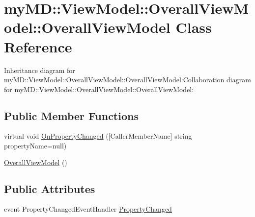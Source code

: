 \hypertarget{classmy_m_d_1_1_view_model_1_1_overall_view_model_1_1_overall_view_model}{
\section{my\-MD::View\-Model::Overall\-View\-Model::Overall\-View\-Model Class Reference}
\label{dd/d0e/classmy_m_d_1_1_view_model_1_1_overall_view_model_1_1_overall_view_model}
}
Inheritance diagram for my\-MD::View\-Model::Overall\-View\-Model::Overall\-View\-Model:Collaboration diagram for my\-MD::View\-Model::Overall\-View\-Model::Overall\-View\-Model:\subsection*{Public Member Functions}
\begin{CompactItemize}
\item 
\hypertarget{classmy_m_d_1_1_view_model_1_1_overall_view_model_1_1_overall_view_model_36ccceda2aba353ee6523df3e370c625}{
virtual void \hyperlink{classmy_m_d_1_1_view_model_1_1_overall_view_model_1_1_overall_view_model_36ccceda2aba353ee6523df3e370c625}{On\-Property\-Changed} (\mbox{[}Caller\-Member\-Name\mbox{]} string property\-Name=null)}
\label{dd/d0e/classmy_m_d_1_1_view_model_1_1_overall_view_model_1_1_overall_view_model_36ccceda2aba353ee6523df3e370c625}

\item 
\hypertarget{classmy_m_d_1_1_view_model_1_1_overall_view_model_1_1_overall_view_model_7c0afeac6feb1017f03db3db6a651e67}{
\hyperlink{classmy_m_d_1_1_view_model_1_1_overall_view_model_1_1_overall_view_model_7c0afeac6feb1017f03db3db6a651e67}{Overall\-View\-Model} ()}
\label{dd/d0e/classmy_m_d_1_1_view_model_1_1_overall_view_model_1_1_overall_view_model_7c0afeac6feb1017f03db3db6a651e67}

\end{CompactItemize}
\subsection*{Public Attributes}
\begin{CompactItemize}
\item 
\hypertarget{classmy_m_d_1_1_view_model_1_1_overall_view_model_1_1_overall_view_model_6024f09b155d231e67118b1b6b63e413}{
event Property\-Changed\-Event\-Handler \hyperlink{classmy_m_d_1_1_view_model_1_1_overall_view_model_1_1_overall_view_model_6024f09b155d231e67118b1b6b63e413}{Property\-Changed}}
\label{dd/d0e/classmy_m_d_1_1_view_model_1_1_overall_view_model_1_1_overall_view_model_6024f09b155d231e67118b1b6b63e413}

\end{CompactItemize}

